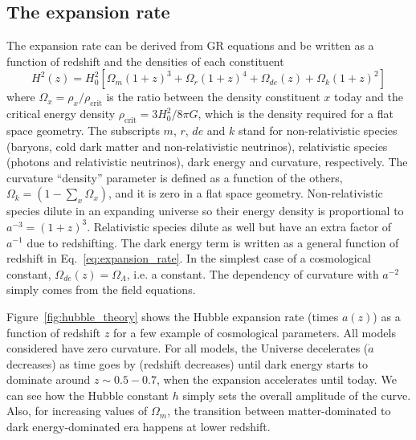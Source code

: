     \subsection{The expansion rate}
    \label{intro:model:expansion_rate}

    The expansion rate can be derived from GR equations and be written as a function of 
    redshift and the densities of each constituent
    \begin{equation}
        H^2(z) = H^2_0 \left[ \Omega_m(1+z)^3 + \Omega_r (1+z)^4 + \Omega_{de}(z) + \Omega_k(1+z)^2\right]
        \label{eq:expansion_rate}
    \end{equation}
    where $\Omega_x = \rho_x / \rho_\mathrm{ crit}$ is the ratio between the density 
    constituent $x$ today and the critical energy density $\rho_\mathrm{ crit} = 3H_0^2/8\pi G$, 
    which is the density required for a flat space geometry. 
    The subscripts $m$, $r$, $de$ and $k$ stand
    for non-relativistic species (baryons, cold dark matter and non-relativistic neutrinos), 
    relativistic species (photons and relativistic neutrinos), dark energy and curvature, 
    respectively. The curvature ``density'' parameter is defined as a function of the others,
    $\Omega_k = (1-\sum_x \Omega_x)$, and it is zero in a flat space geometry.
    Non-relativistic species dilute in an expanding universe so their energy density is 
    proportional to $a^{-3} = (1+z)^3$. Relativistic species dilute as well but have an
    extra factor of $a^{-1}$ due to redshifting. 
    The dark energy term is written as a general function of redshift in Eq.~\ref{eq:expansion_rate}.
    In the simplest case of a cosmological constant, $\Omega_{de}(z) = \Omega_\Lambda$, i.e. a constant.
    The dependency of curvature with $a^{-2}$ simply comes from the field equations. 

    Figure~\ref{fig:hubble_theory} shows the Hubble expansion rate (times $a(z)$) as a function of redshift $z$
    for a few example of cosmological parameters. All models considered have zero curvature. 
    For all models, the Universe decelerates ($\dot{a}$ decreases) as time goes by (redshift decreases) 
    until dark energy starts to dominate around $z\sim 0.5-0.7$, when the expansion accelerates until today. 
    We can see how the Hubble constant $h$ simply sets the overall amplitude of the curve.
    Also, for increasing values of $\Omega_m$, the transition between matter-dominated to dark energy-dominated era 
    happens at lower redshift. 

